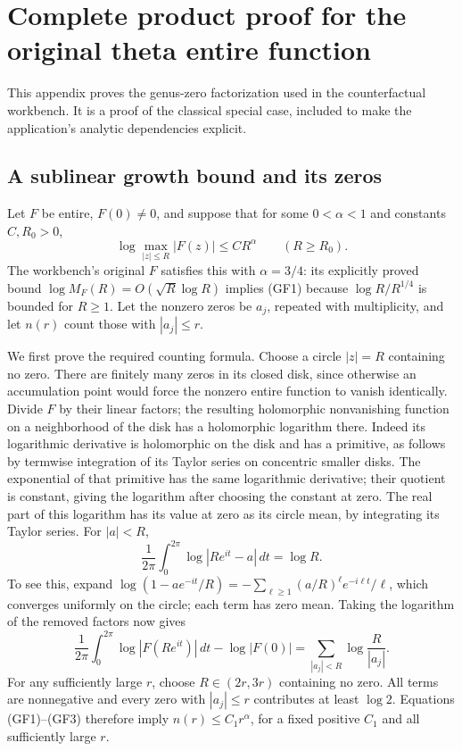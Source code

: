 \section{Complete product proof for the original theta entire function}
This appendix proves the genus-zero factorization used in the
counterfactual workbench. It is a proof of the classical special case,
included to make the application's analytic dependencies explicit.

\subsection{A sublinear growth bound and its zeros}
Let $F$ be entire, $F(0)\ne0$, and suppose that for some
$0<\alpha<1$ and constants $C,R_0>0$,
\[
\log\max_{|z|\le R}|F(z)|\le CR^\alpha\qquad(R\ge R_0).
\tag{GF1}
\]
The workbench's original $F$ satisfies this with $\alpha=3/4$:
its explicitly proved bound $\log M_F(R)=O(\sqrt R\log R)$
implies (GF1) because $\log R/R^{1/4}$ is bounded for $R\ge1$.
Let the nonzero zeros be $a_j$, repeated with multiplicity, and let
$n(r)$ count those with $|a_j|\le r$.

We first prove the required counting formula. Choose a circle
$|z|=R$ containing no zero. There are finitely many zeros in its
closed disk, since otherwise an accumulation point would force the
nonzero entire function to vanish identically. Divide $F$ by their
linear factors; the resulting holomorphic nonvanishing function
on a neighborhood of the disk has a holomorphic logarithm there.
Indeed its logarithmic derivative is holomorphic on the disk and
has a primitive, as follows by termwise integration of its Taylor
series on concentric smaller disks. The exponential of that primitive
has the same logarithmic derivative; their quotient is constant,
giving the logarithm after choosing the constant at zero.
The real part of this logarithm has its value at zero as its circle
mean, by integrating its Taylor series.
For $|a|<R$,
\[
\frac1{2\pi}\int_0^{2\pi}\log|Re^{it}-a|\,dt=\log R.
\tag{GF2}
\]
To see this, expand
$\log(1-ae^{-it}/R)=-\sum_{\ell\ge1}(a/R)^\ell e^{-i\ell t}/\ell$,
which converges uniformly on the circle; each term has zero mean.
Taking the logarithm of the removed factors now gives
\[
\frac1{2\pi}\int_0^{2\pi}\log|F(Re^{it})|\,dt-\log|F(0)|
=\sum_{|a_j|<R}\log\frac{R}{|a_j|}.
\tag{GF3}
\]
For any sufficiently large $r$, choose $R\in(2r,3r)$ containing
no zero. All terms are nonnegative and every zero with
$|a_j|\le r$ contributes at least $\log2$. Equations (GF1)--(GF3)
therefore imply $n(r)\le C_1r^\alpha$, for a fixed positive
$C_1$ and all sufficiently large $r$.

